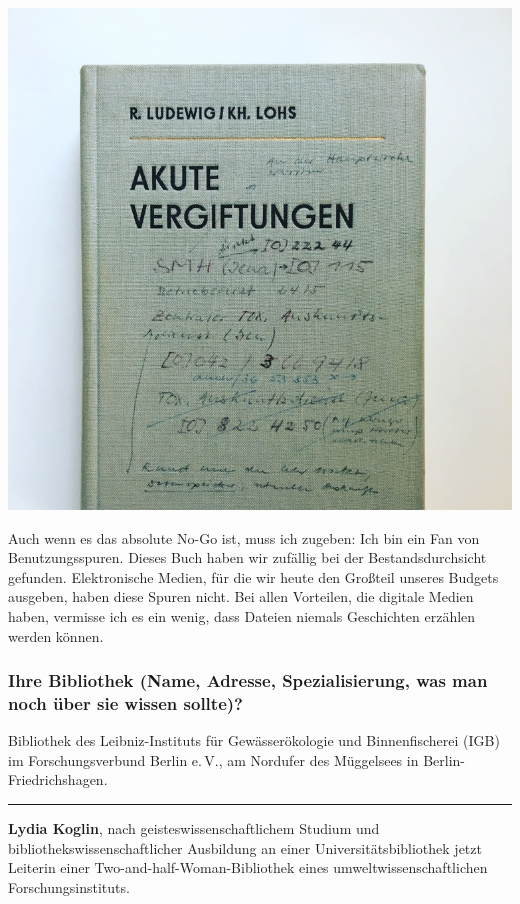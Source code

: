 \begin{center}
\includegraphics{igb/img/vergiftungen.jpg}
\end{center}

Auch wenn es das absolute No-Go ist, muss ich zugeben: Ich bin ein Fan
von Benutzungsspuren. Dieses Buch haben wir zufällig bei der
Bestandsdurchsicht gefunden. Elektronische Medien, für die wir heute den
Großteil unseres Budgets ausgeben, haben diese Spuren nicht. Bei allen
Vorteilen, die digitale Medien haben, vermisse ich es ein wenig, dass
Dateien niemals Geschichten erzählen werden können.

\hypertarget{ihre-bibliothek-name-adresse-spezialisierung-was-man-noch-uxfcber-sie-wissen-sollte}{%
\subsubsection*{Ihre Bibliothek (Name, Adresse, Spezialisierung, was man noch
über sie wissen
sollte)?}\label{ihre-bibliothek-name-adresse-spezialisierung-was-man-noch-uxfcber-sie-wissen-sollte}}

Bibliothek des Leibniz-Instituts für Gewässerökologie und
Binnenfischerei (IGB) im Forschungsverbund Berlin e.\,V., am Nordufer des
Müggelsees in Berlin-Friedrichshagen.

\begin{center}\rule{0.5\linewidth}{\linethickness}\end{center}

\textbf{Lydia Koglin}, nach geisteswissenschaftlichem Studium und
bibliothekswissenschaftlicher Ausbildung an einer Universitätsbibliothek
jetzt Leiterin einer Two-and-half-Woman-Bibliothek eines
umweltwissenschaftlichen Forschungsinstituts.
